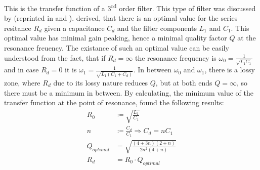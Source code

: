 This is the transfer function of a 3\textsuperscript{rd} order filter. This type of filter was discussed by \citeauthor{input_filter_middlebrook} \cite{input_filter_middlebrook} (reprinted in \cite{input_filter_middlebrook_reprint1} and \cite{input_filter_middlebrook_reprint2}). \citeauthor{input_filter_middlebrook} derived, that there is an optimal value for the series resitance $R_d$ given a capacitance $C_d$ and the filter components $L_1$ and $C_1$. This optimal value has minimal gain peaking, hence a minimal quality factor $Q$ at the resonance freuency. The existance of such an optimal value can be easily understood from the fact, that if $R_d = \infty$ the resonance frequency is $\omega_0 = \frac{1}{\sqrt{L_1 C_1}}$ and in case $R_d = 0$ it is $\omega_1 = \frac{1}{\sqrt{L_1 \left(C_1 + C_d\right)}}$. In between $\omega_0$ and $\omega_1$, there is a lossy zone, where $R_d$ due to its lossy nature reduces $Q$, but at both ends $Q = \infty$, so there must be a minimum in between. By calculating, the minimum value of the transfer function at the point of resonance, \citeauthor{input_filter_middlebrook} found the following results:
\begin{align}
    R_0 &\coloneqq \sqrt{\frac{L_1}{C_1}}\\
    n &\coloneqq \frac{C_d}{C_1} \Rightarrow C_d = n C_1 \label{eqn:lc_filter_cd}\\
    Q_{optimal} &= \sqrt{\frac{(4+3 n) (2+n)}{2 n^2 (4+n)}}\\
    R_d &= R_0 \cdot Q_{optimal} \label{eqn:lc_filter_rd}
\end{align}


